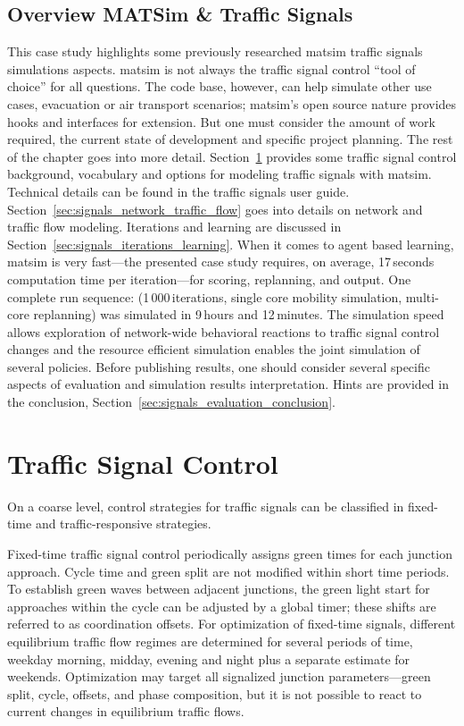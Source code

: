 \subsection{Overview MATSim \& Traffic Signals}
This case study highlights some previously researched \gls{matsim} traffic signals simulations aspects. 
\gls{matsim} is not always the traffic signal control ``tool of choice'' for all questions. 
The code base, however, can help simulate other use cases, \eg evacuation or air transport scenarios; 
\gls{matsim}'s open source nature provides hooks and interfaces for extension. 
But one must consider the amount of work required, the current state of development and specific project planning. 
The rest of the chapter goes into more detail.  
Section~\ref{sec:signals_traffic_signal_control} provides some traffic signal control background, vocabulary and options for modeling traffic signals with \gls{matsim}. 
Technical details can be found in the traffic signals user guide.  
Section~\ref{sec:signals_network_traffic_flow} goes into details on network and traffic flow modeling. 
Iterations and learning are discussed in Section~\ref{sec:signals_iterations_learning}. 
When it comes to agent based learning, \gls{matsim} is very fast---the presented case study requires, on average, 17\,seconds computation time per iteration---for scoring, replanning, and output. One complete run sequence: (1\,000\,iterations, single core mobility simulation, multi-core replanning) was simulated in 9\,hours and 12\,minutes. 
The simulation speed allows exploration of network-wide behavioral reactions to  traffic signal control changes and 
the resource efficient simulation enables the joint simulation of several policies. 
Before publishing results, one should consider several specific aspects of evaluation and simulation results interpretation. 
Hints are provided in the conclusion,  Section~\ref{sec:signals_evaluation_conclusion}. 

\section{Traffic Signal Control}
\label{sec:signals_traffic_signal_control}
On a coarse level, control strategies for traffic signals can be classified in fixed-time and traffic-responsive strategies. 

Fixed-time traffic signal control periodically assigns green times for each junction approach. 
Cycle time and green split are not modified within short time periods. 
To establish green waves between adjacent junctions, the green light start for approaches within the cycle can be adjusted by a global timer; 
these shifts are referred to as coordination offsets. 
For optimization of fixed-time signals, different equilibrium traffic flow regimes are determined for several periods of time, \eg weekday morning, midday, evening and night plus a separate estimate for weekends. Optimization may target all signalized junction parameters---green split, cycle, offsets, and phase composition,  
but it is not possible to react to current changes in equilibrium traffic flows. 

